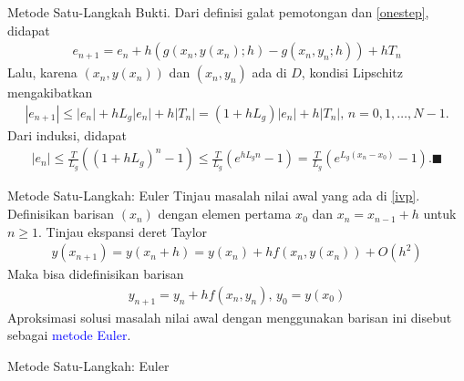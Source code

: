 \documentclass[xcolor={dvipsnames}, 9pt]{beamer}
\renewcommand{\emph}[1]{\textcolor{Blue}{#1}}
\begin{document}
    \begin{frame}{Metode Satu-Langkah}
        Bukti. Dari definisi galat pemotongan dan \eqref{onestep}, didapat
        \begin{align*}
            e_{n+1} = e_n + h(g(x_n,y(x_n);h)-g(x_n,y_n;h))+hT_n
        \end{align*}
        Lalu, karena $(x_n,y(x_n))$ dan $(x_n,y_n)$ ada di $D$, kondisi Lipschitz mengakibatkan
        \begin{align*}
            |e_{n+1}| \leq |e_n| + hL_g|e_n| + h|T_n| = (1+hL_g)|e_n| + h|T_n|, \, n=0,1,\dots,N-1.
        \end{align*}
        Dari induksi, didapat
        \begin{align*}
            |e_n| \leq \frac{T}{L_g}((1+hL_g)^n-1) \leq \frac{T}{L_g}(e^{hL_gn}-1) = \frac{T}{L_g}(e^{L_g(x_n-x_0)}-1). \blacksquare
        \end{align*}
    \end{frame}
    \begin{frame}{Metode Satu-Langkah: Euler}
        Tinjau masalah nilai awal yang ada di \eqref{ivp}. Definisikan barisan $(x_n)$ dengan elemen pertama $x_0$ dan $x_n = x_{n-1} + h$ untuk $n\geq 1$. Tinjau ekspansi deret Taylor
        \begin{align*}
            y(x_{n+1}) = y(x_n+h) = y(x_n) + hf(x_n,y(x_n)) + O(h^2)
        \end{align*}
        Maka bisa didefinisikan barisan
        \begin{align}\label{euler}
            y_{n+1} = y_n + hf(x_n,y_n), \, y_0 = y(x_0)
        \end{align}
        Aproksimasi solusi masalah nilai awal dengan menggunakan barisan ini disebut sebagai \emph{metode Euler}.
    \end{frame}
    \begin{frame}{Metode Satu-Langkah: Euler}
        
    \end{frame}
\end{document}
